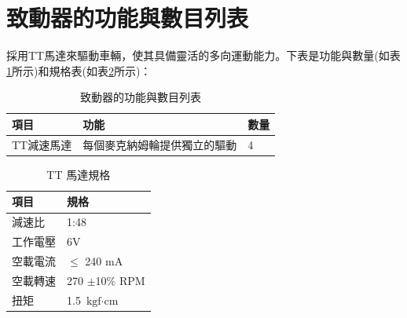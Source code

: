 \documentclass[12pt]{article}       %
\begin{document}

\section{\centering 致動器的功能與數目列表}


\hspace{2em}採用TT馬達來驅動車輛，使其具備靈活的多向運動能力。下表是功能與數量(如表\ref{tab:TT2}所示)和規格表(如表\ref{tab:ttm}所示)：

\begin{table}[H]
    \centering
    \caption{致動器的功能與數目列表}
    \vspace{6pt} %
    \label{tab:TT2}
    \begin{tabular}{lll}
        \toprule
        \textbf{項目} & \textbf{功能} & \textbf{數量}\\
        \midrule
        TT減速馬達  & 每個麥克納姆輪提供獨立的驅動 &4\\
        \bottomrule
    \end{tabular}
\end{table}

\begin{table}[H]
    \centering
    \caption{TT 馬達規格\cite{JustMakeIt_TT_Motor}}
    \vspace{6pt} %
    \label{tab:ttm}
    \begin{tabular}{ll}
        \toprule
        \textbf{項目} & \textbf{規格} \\
        \midrule
        減速比  & 1:48 \\
        工作電壓  & 6V \\
        空載電流 & $\leq$ 240 $\text{mA}$ \\
        空載轉速  & 270 $\pm$10$\%$ RPM \\
        扭矩  & 1.5 $\text{kgf} \cdot \text{cm}$ \\
        \bottomrule
    \end{tabular}
\end{table}
\end{document}
